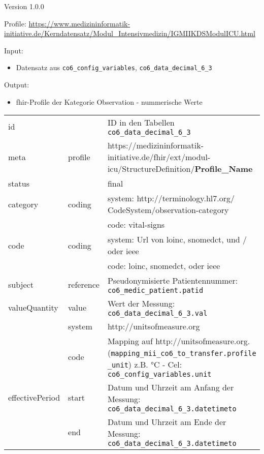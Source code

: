 \noindent Version 1.0.0

\noindent Profile: \url{https://www.medizininformatik-initiative.de/Kerndatensatz/Modul_Intensivmedizin/IGMIIKDSModulICU.html}

\noindent Input:
\begin{itemize}
	\item Datensatz aus \texttt{co6\_config\_variables}, \texttt{co6\_data\_decimal\_6\_3} %
\end{itemize}
Output:
\begin{itemize}
	\item \ac{fhir}-Profile der Kategorie \glqq Observation\grqq{} - nummerische Werte %
\end{itemize}
\begin{longtable}{|l|l|p{7.5cm}|} 
	\hline
	\rowcolor{lightgray} \multicolumn{3}{|l|}{Data Mapping (inhaltlich) - nummerische Werte} \\ \hline
	id &  & ID in den Tabellen \texttt{co6\_data\_decimal\_6\_3} \\ \hline
	meta & profile & https://medizininformatik-initiative.de/fhir/ext/modul-icu/StructureDefinition/\textbf{Profile\_Name} \\ \hline 
	status &  & final  \\ \hline 
	category & coding & system: http://terminology.hl7.org/ CodeSystem/observation-category \\ 
	\cline{3-3}
	& & code: vital-signs \\ \hline
	code & coding & system: Url von \ac{loinc}, \ac{snomedct}, und / oder \ac{ieee} \\ 
	\cline{3-3} 
	 &  & code: \ac{loinc}, \ac{snomedct}, oder \ac{ieee} \\ \hline
	subject & reference & Pseudonymisierte Patientennummer: \texttt{co6\_medic\_patient.patid} \\ \hline
	valueQuantity & value & Wert der Messung: \texttt{co6\_data\_decimal\_6\_3.val} \\
	\cline{2-3}
	 & system & http://unitsofmeasure.org \\ 
	 \cline{2-3}
	 & code & Mapping auf http://unitsofmeasure.org. (\texttt{mapping\_mii\_co6\_to\_transfer.profile \_unit}) z.B. °C - Cel: \texttt{co6\_config\_variables.unit} \\ \hline
    effectivePeriod & start & Datum und Uhrzeit am Anfang der Messung: \texttt{co6\_data\_decimal\_6\_3.datetimeto} \\ 
    \cline{2-3}
     & end & Datum und Uhrzeit am Ende der Messung: \texttt{co6\_data\_decimal\_6\_3.datetimeto} \\ \hline
\end{longtable}

